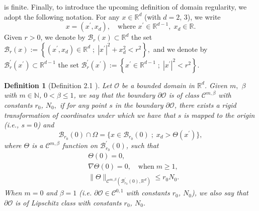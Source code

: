 \documentclass[a4paper,12pt,reqno,natbib]{amsart}
\newtheorem{definition}[theorem]{Definition}
\def\O{\mathcal O}
\begin{document}
is finite. Finally, to introduce the upcoming definition of domain regularity, we adopt the following notation. For any \( x \in \mathbb{R}^d \) (with $d=2,\,3$), we write
\[
x = (x^\prime, x_d), \quad \text{where } x^\prime \in \mathbb{R}^{d-1},\; x_d \in \mathbb{R}.
\]
Given \( r > 0 \), we denote by \( \mathcal{B}_r(x) \subset \mathbb{R}^d \) the set
\(
\mathcal{B}_r(x) := \left\{ (x^\prime, x_d) \in \mathbb{R}^d \; ; \; |x^\prime|^2 + x_d^2 < r^2 \right\},
\)
and we denote by \( \mathcal{B}_r^\prime(x^\prime) \subset \mathbb{R}^{d-1} \) the set
\(
\mathcal{B}_r^\prime(x^\prime) := \left\{ x^\prime \in \mathbb{R}^{d-1} \; ; \; |x^\prime|^2 < r^2 \right\}.
\)

\begin{definition}[Definition 2.1 \cite{alessandrini2002detecting}]\label{def-0}
Let $\O$ be a bounded domain in $\mathbb{R}^d$. Given $m,$ $\beta$ with $m\in\mathbb{N}$, $0<\beta\leq1$, we say that the boundary $\partial \O$ is of class $\mathcal{C}^{m,\beta}$ with constants $r_0$, $N_0,$ if for any point $s$ in the boundary $\partial \O$, there exists a rigid transformation of coordinates under which we have that $s$ is mapped to the origin (i.e., $s=0$) and
    \begin{equation*}
        \mathcal{B}_{r_0}(0)\cap\Omega=\big\{x\in \mathcal{B}_{r_0}(0)\; ; \; x_d> \Theta(x^\prime)  \big\},
    \end{equation*}
    where $\Theta$ is a $\mathcal{C}^{m,\beta}$ function on $\mathcal{B}^\prime_{r_0}(0)$, such that 
\begin{align*}
    &\Theta(0)=0,\\
    &\nabla\Theta(0)=0,\quad\text{when}\;m\geq1,\\
    &\big\| \Theta\big\|_{\mathcal{C}^{m,\beta}(\mathcal{B}^\prime_{r_0}(0),\mathbb{R}^d)}\leq r_0N_0.
\end{align*}
When $m=0$ and $\beta=1$ (i.e. $\partial \O\in \mathcal{C}^{0,1}$ with constants $r_0$, $N_0$), we also say that $\partial \O$ is of Lipschitz class with constants $r_0$, $N_0$.
\end{definition}







\end{document}
